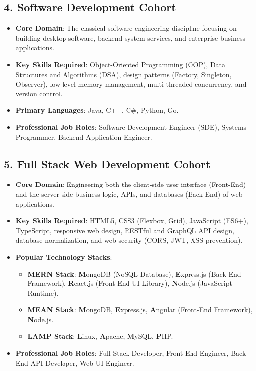 \subsection{4. Software Development Cohort}
\begin{itemize}[leftmargin=1.5em]
    \item \textbf{Core Domain}: The classical software engineering discipline focusing on building desktop software, backend system services, and enterprise business applications.
    \item \textbf{Key Skills Required}: Object-Oriented Programming (OOP), Data Structures and Algorithms (DSA), design patterns (Factory, Singleton, Observer), low-level memory management, multi-threaded concurrency, and version control.
    \item \textbf{Primary Languages}: Java, C++, C\#, Python, Go.
    \item \textbf{Professional Job Roles}: Software Development Engineer (SDE), Systems Programmer, Backend Application Engineer.
\end{itemize}

\subsection{5. Full Stack Web Development Cohort}
\begin{itemize}[leftmargin=1.5em]
    \item \textbf{Core Domain}: Engineering both the client-side user interface (Front-End) and the server-side business logic, APIs, and databases (Back-End) of web applications.
    \item \textbf{Key Skills Required}: HTML5, CSS3 (Flexbox, Grid), JavaScript (ES6+), TypeScript, responsive web design, RESTful and GraphQL API design, database normalization, and web security (CORS, JWT, XSS prevention).
    \item \textbf{Popular Technology Stacks}:
    \begin{itemize}
        \item \textbf{MERN Stack}: \textbf{M}ongoDB (NoSQL Database), \textbf{E}xpress.js (Back-End Framework), \textbf{R}eact.js (Front-End UI Library), \textbf{N}ode.js (JavaScript Runtime).
        \item \textbf{MEAN Stack}: \textbf{M}ongoDB, \textbf{E}xpress.js, \textbf{A}ngular (Front-End Framework), \textbf{N}ode.js.
        \item \textbf{LAMP Stack}: \textbf{L}inux, \textbf{A}pache, \textbf{M}ySQL, \textbf{P}HP.
    \end{itemize}
    \item \textbf{Professional Job Roles}: Full Stack Developer, Front-End Engineer, Back-End API Developer, Web UI Engineer.
\end{itemize}

